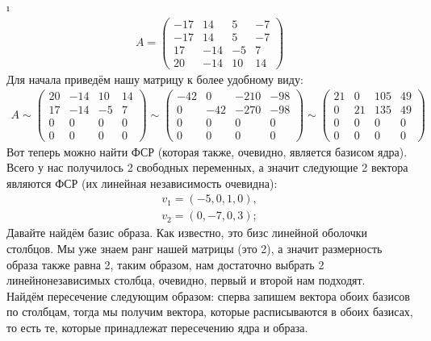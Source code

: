 \i 
\begin{gather*}
    A = 
    \begin{pmatrix}
        -17 & 14 & 5 & -7\\
        -17 & 14 & 5 & -7\\
        17 & -14 & -5 & 7\\
        20 & -14 & 10 & 14
    \end{pmatrix}
\end{gather*}
Для начала приведём нашу матрицу к более удобному виду:
\begin{gather*}
    A \sim
    \begin{pmatrix}
        20 & -14 & 10 & 14\\
        17 & -14 & -5 & 7\\
        0 & 0 & 0 & 0\\
        0 & 0 & 0 & 0
    \end{pmatrix} \sim 
    \begin{pmatrix}
        -42 & 0 & -210 & -98\\
        0 & -42 & -270 & -98\\
        0 & 0 & 0 & 0\\
        0 & 0 & 0 & 0
    \end{pmatrix} \sim
    \begin{pmatrix}
        21 & 0 & 105 & 49\\
        0 & 21 & 135 & 49\\
        0 & 0 & 0 & 0\\
        0 & 0 & 0 & 0
    \end{pmatrix}
\end{gather*}
Вот теперь можно найти ФСР (которая также, очевидно, является базисом ядра). Всего у нас получилось 2 свободных переменных, а значит следующие 2 вектора являются ФСР (их линейная независимость очевидна):
\begin{gather*}
    v_1 = (-5, 0, 1, 0),\\
    v_2 = (0, -7, 0, 3);
\end{gather*}
Давайте найдём базис образа. Как известно, это бизс линейной оболочки столбцов. Мы уже знаем ранг нашей матрицы (это 2), а значит размерность образа также равна 2, таким образом, нам достаточно выбрать 2 линейнонезависимых столбца, очевидно, первый и второй нам подходят.\\
Найдём пересечение следующим образом: сперва запишем вектора обоих базисов по столбцам, тогда мы получим вектора, которые расписываются в обоих базисах, то есть те, которые принадлежат пересечению ядра и образа.
